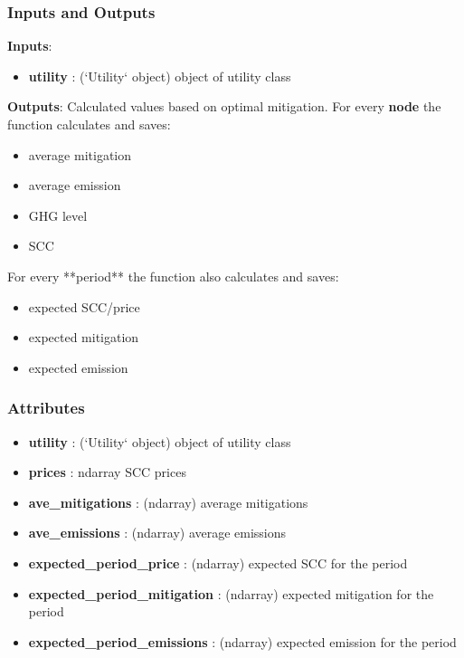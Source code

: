 \documentclass[12pt]{article}
\begin{document}
\subsubsection{Inputs and Outputs}
\textbf{Inputs}:
\begin{itemize}
  \item \textbf{utility} : (`Utility` object)
		object of utility class
\end{itemize}
\textbf{Outputs}:
Calculated values based on optimal mitigation. For every \textbf{node} the function calculates and saves:
\begin{itemize}
  \item average mitigation
  \item average emission
  \item GHG level
  \item SCC
\end{itemize}
For every **period** the function also calculates and saves:
\begin{itemize}
  \item expected SCC/price
  \item expected mitigation
  \item expected emission
\end{itemize}
\subsubsection{Attributes}
\begin{itemize}
  \item	\textbf{utility} : (`Utility` object)
		object of utility class
  \item \textbf{prices} : ndarray
		SCC prices
  \item 	\textbf{ave\_mitigations} : (ndarray)
		average mitigations
  \item 	\textbf{ave\_emissions} : (ndarray)
		average emissions
  \item 	\textbf{expected\_period\_price }: (ndarray)
		expected SCC for the period
  \item  	\textbf{expected\_period\_mitigation} : (ndarray)
		expected mitigation for the period
  \item 	\textbf{expected\_period\_emissions} : (ndarray)
		expected emission for the period
\end{itemize}
\end{document}
